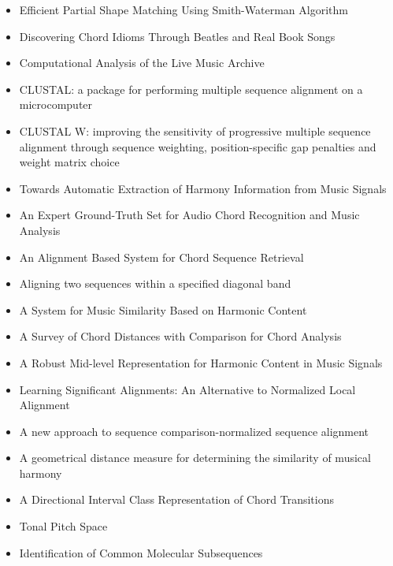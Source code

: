 \begin{itemize}
\item Efficient Partial Shape Matching Using Smith-Waterman Algorithm \cite{liu2012shape}
\item Discovering Chord Idioms Through Beatles and Real Book Songs \cite{mauch:dci}
\item Computational Analysis of the Live Music Archive \cite{bechhofer2014computational}
\item CLUSTAL: a package for performing multiple sequence alignment on a microcomputer \cite{higgins1988clustal}
\item CLUSTAL W: improving the sensitivity of progressive multiple sequence alignment through sequence weighting, position-specific gap penalties and weight matrix choice \cite{thompson1994clustal}
\item Towards Automatic Extraction of Harmony Information from Music Signals \cite{harte2010towards}
\item An Expert Ground-Truth Set for Audio Chord Recognition and Music Analysis \cite{BurgoyneEtAl_2011_AnExpeGrouSet}
\item An Alignment Based System for Chord Sequence Retrieval \cite{hanna2009alignment}
\item Aligning two sequences within a specified diagonal band \cite{chao1992aligning}
\item A System for Music Similarity Based on Harmonic Content \cite{BelloEtAl_2005_ARobuMidRepr}
\item A Survey of Chord Distances with Comparison for Chord Analysis \cite{rocher2010survey}
\item A Robust Mid-level Representation for Harmonic Content in Music Signals \cite{BelloEtAl_2005_ARobuMidRepr}
\item Learning Significant Alignments: An Alternative to Normalized Local Alignment \cite{breimer2002learning}
\item A new approach to sequence comparison-normalized sequence alignment \cite{arslan2001new}
\item A geometrical distance measure for determining the similarity of musical harmony \cite{de2013geometrical}
\item A Directional Interval Class Representation of Chord Transitions \cite{Cambouropoulos2012}
\item Tonal Pitch Space \cite{lerdahl1988tonal}
\item Identification of Common Molecular Subsequences \cite{smith1981identification}
\end{itemize}